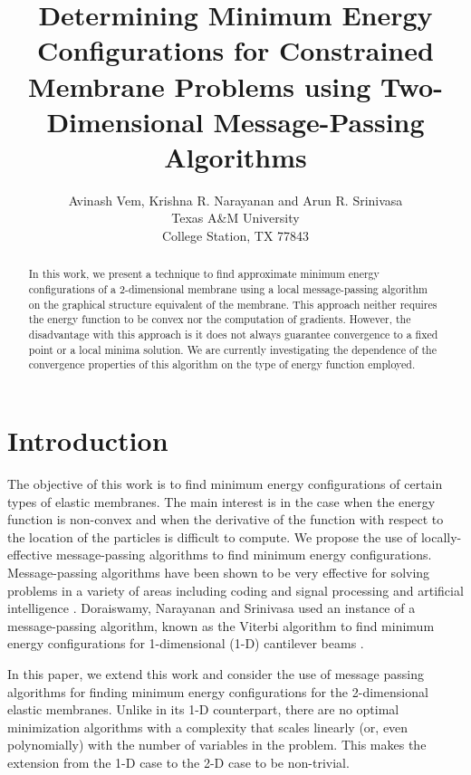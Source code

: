 \documentclass[journal, onecolumn]{IEEEtran}
\begin{document}
\title{Determining Minimum Energy Configurations for Constrained Membrane Problems using Two-Dimensional Message-Passing Algorithms}
\author{Avinash Vem, Krishna R. Narayanan and Arun R. Srinivasa\\
Texas A\&M University\\
College Station, TX 77843}
\maketitle


\begin{abstract}
In this work, we present a technique to find approximate minimum energy configurations of a 2-dimensional membrane using a local message-passing algorithm on the graphical structure equivalent of the membrane. This approach neither requires the energy function to be convex nor the computation of gradients. However, the disadvantage with this approach is it does not always guarantee convergence to a fixed point or a local minima solution. We are currently investigating the dependence of the convergence properties of this algorithm on the type of energy function employed.
\end{abstract}

\section{Introduction}
\label{Section:Introduction}
The objective of this work is to find minimum energy configurations of certain types of elastic membranes.  The main interest is in the case when the energy function is non-convex and when the derivative of the function with respect to the location of the particles is difficult to compute.  We propose the use of locally-effective message-passing algorithms to find minimum energy configurations. Message-passing algorithms have been shown to be very effective for solving problems in a variety of areas including coding and signal processing \cite{kschischang2001factor} and artificial intelligence \cite{pearl1988probabilistic}. Doraiswamy, Narayanan and Srinivasa used an instance of a message-passing algorithm, known as the Viterbi algorithm to find minimum energy configurations for 1-dimensional (1-D) cantilever beams \cite{doraiswamy2012finding}.

In this paper, we extend this work and consider the use of message passing algorithms for finding minimum energy configurations for the 2-dimensional elastic membranes. Unlike in its 1-D counterpart, there are no optimal minimization algorithms with a complexity that scales linearly (or, even polynomially) with the number of variables in the problem. This makes the extension from the 1-D case to the 2-D case to be non-trivial.
\end{document}
